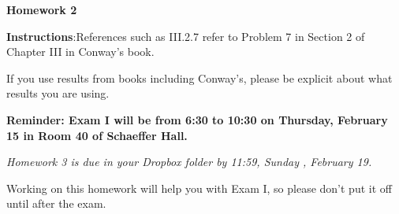 \documentclass{article}%
\begin{document}
\begin{center}

\textbf{Homework 2}\bigskip

\end{center}



\noindent\textbf{Instructions}:References such as III.2.7 refer to Problem 7 in Section 2 of Chapter III in Conway's book.\smallskip



\noindent If you use results from books including Conway's, please be explicit about what results you are using.

\noindent \textbf{Reminder: Exam I will be from 6:30 to 10:30 on Thursday, February 15 in Room 40 of Schaeffer Hall.}






\begin{center}

\emph{Homework 3 is due in your Dropbox folder by 11:59, Sunday , February 19.}

\end{center} 

\medskip

\noindent Working on this homework will help you with Exam I, so please don't put it off until after the exam.
\end{document}

